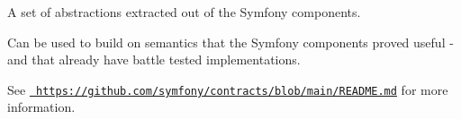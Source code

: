 A set of abstractions extracted out of the Symfony components.

Can be used to build on semantics that the Symfony components proved useful -\/ and that already have battle tested implementations.

See \href{https://github.com/symfony/contracts/blob/main/README.md}{\texttt{ https\+://github.\+com/symfony/contracts/blob/main/\+README.\+md}} for more information. 